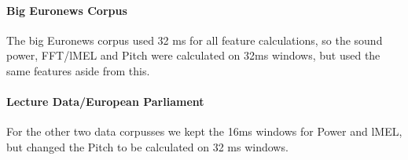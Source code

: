 \paragraph{Big Euronews Corpus} The big Euronews corpus used 32 ms for all feature calculations, so the sound power, FFT/lMEL and Pitch were calculated on 32ms windows, but used the same features aside from this.
\paragraph{Lecture Data/European Parliament} For the other two data corpusses we kept the 16ms windows for Power and lMEL, but changed the Pitch to be calculated on 32 ms windows.

